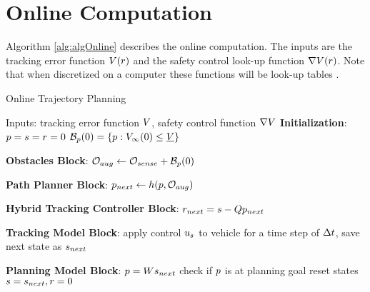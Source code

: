 \section{Online Computation \label{sec:online}}

Algorithm \ref{alg:algOnline} describes the online computation. The inputs are the tracking error function $V(r)$ and the safety control look-up function $\nabla V(r)$. Note that when discretized on a computer these functions will be look-up tables . 

\begin{algorithm}	
	\caption{Online Trajectory Planning}
	\label{alg:algOnline}
	\begin{algorithmic}[1]
		\STATE Inputs: tracking error function $V$, safety control function $\nabla V$
		\STATE \textbf{Initialization}: \label{ln:Istart}
		\STATE $p = s = r = 0$
		\STATE $\mathcal B_p(0) = \{p: V_\infty(0) \le \underline{V}\}$ \label{ln:Iend}
		
		\STATE \textbf{Obstacles Block}: \label{ln:obsStart}
		\STATE $\mathcal{O}_{aug} \leftarrow \mathcal{O}_{sense} + \mathcal B_p(0)$ \label{ln:obsEnd}
		
		\STATE \textbf{Path Planner Block}:\label{ln:plannerStart}
		\STATE $p_{next} \leftarrow h(p, \mathcal{O}_{aug})$\label{ln:plannerEnd}
		
		\STATE \textbf{Hybrid Tracking Controller Block}:\label{ln:controllerStart}
		\STATE $r_{next} = s - Qp_{next}$
		
		\ELSE {} \ENDIF \label{ln:controllerEnd}
		
		\STATE \textbf{Tracking Model Block}: \label{ln:trackingStart}
		\STATE apply control $u_s$ to vehicle for a time step of $\Delta t$, save next state as $s_{next}$ \label{ln:trackingEnd}
		
		\STATE \textbf{Planning Model Block}:\label{ln:planningStart}
		\STATE $p = Ws_{next}$
		\STATE check if $p$ is at planning goal
		\STATE reset states $s = s_{next}, r = 0$ \label{ln:planningEnd}
		\ENDWHILE
	\end{algorithmic}
\end{algorithm}



